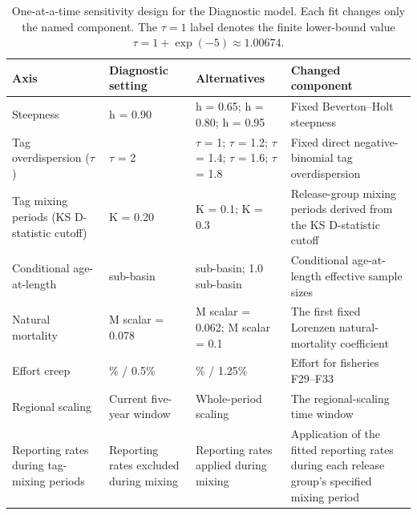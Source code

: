 \begin{table}[htbp]
\centering
\caption{One-at-a-time sensitivity design for the Diagnostic model. Each fit changes only the named component. The $\tau=1$ label denotes the finite lower-bound value $\tau=1+\exp(-5)\approx1.00674$.}
\label{tab:bet-sensitivity-design}
\scriptsize
\setlength{\tabcolsep}{3pt}
\renewcommand{\arraystretch}{1.08}
\begin{tabularx}{\textwidth}{@{}>{\raggedright\arraybackslash}p{}>{\raggedright\arraybackslash}p{}>{\raggedright\arraybackslash}p{}X@{}}
\toprule
Axis & Diagnostic setting & Alternatives & Changed component \\
\midrule
Steepness & h = 0.90 & h = 0.65; h = 0.80; h = 0.95 & Fixed Beverton--Holt steepness \\
Tag overdispersion ($\tau$) & $\tau$ = 2 & $\tau$ = 1; $\tau$ = 1.2; $\tau$ = 1.4; $\tau$ = 1.6; $\tau$ = 1.8 & Fixed direct negative-binomial tag overdispersion \\
Tag mixing periods (KS D-statistic cutoff) & K = 0.20 & K = 0.1; K = 0.3 & Release-group mixing periods derived from the KS D-statistic cutoff \\
Conditional age-at-length & 0.75 sub-basin & 0.5 sub-basin; 1.0 sub-basin & Conditional age-at-length effective sample sizes \\
Natural mortality & M scalar = 0.078 & M scalar = 0.062; M scalar = 0.1 & The first fixed Lorenzen natural-mortality coefficient \\
Effort creep & 1\% / 0.5\% & 2.5\% / 1.25\% & Effort for fisheries F29--F33 \\
Regional scaling & Current five-year window & Whole-period scaling & The regional-scaling time window \\
Reporting rates during tag-mixing periods & Reporting rates excluded during mixing & Reporting rates applied during mixing & Application of the fitted reporting rates during each release group's specified mixing period \\
\bottomrule
\end{tabularx}
\end{table}

